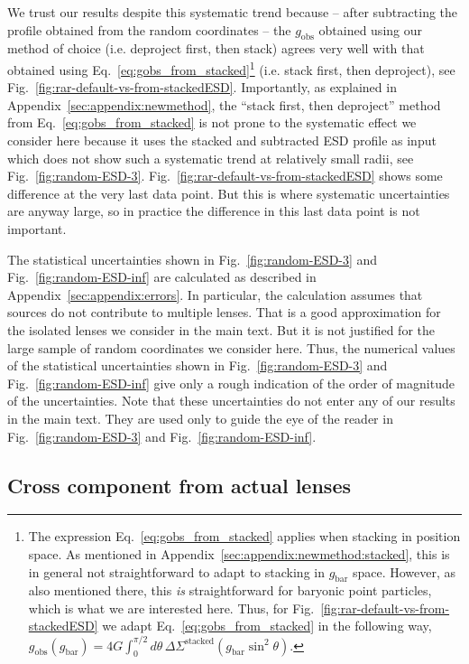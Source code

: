 \documentclass[a4paper,11pt]{article}
\newcommand{\gobs}{\ensuremath{g_{\mathrm{obs}}}}
\begin{document}
We trust our results despite this systematic trend because -- after subtracting the profile obtained from the random coordinates -- the $\gobs$ obtained using our method of choice (i.e. deproject first, then stack) agrees very well with that obtained using Eq.~\eqref{eq:gobs_from_stacked}\footnote{
  The expression Eq.~\eqref{eq:gobs_from_stacked} applies when stacking in position space.
  As mentioned in Appendix~\ref{sec:appendix:newmethod:stacked}, this is in general not straightforward to adapt to stacking in $g_{\mathrm{bar}}$ space.
  However, as also mentioned there, this \emph{is} straightforward for baryonic point particles, which is what we are interested here.
  Thus, for Fig.~\ref{fig:rar-default-vs-from-stackedESD} we adapt Eq.~\eqref{eq:gobs_from_stacked} in the following way, $g_{\mathrm{obs}}(g_{\mathrm{bar}}) = 4G \int_0^{\pi/2} d\theta \, \Delta \Sigma^{\mathrm{stacked}}(g_{\mathrm{bar}} \sin^2 \theta)$.
} (i.e. stack first, then deproject), see Fig.~\ref{fig:rar-default-vs-from-stackedESD}.
Importantly, as explained in Appendix~\ref{sec:appendix:newmethod}, the ``stack first, then deproject'' method from Eq.~\eqref{eq:gobs_from_stacked} is not prone to the systematic effect we consider here because it uses the stacked and subtracted ESD profile as input which does not show such a systematic trend at relatively small radii, see Fig.~\ref{fig:random-ESD-3}.
Fig.~\ref{fig:rar-default-vs-from-stackedESD} shows some difference at the very last data point.
But this is where systematic uncertainties are anyway large, so in practice the difference in this last data point is not important.

The statistical uncertainties shown in Fig.~\ref{fig:random-ESD-3} and Fig.~\ref{fig:random-ESD-inf} are calculated as described in Appendix~\ref{sec:appendix:errors}.
In particular, the calculation assumes that sources do not contribute to multiple lenses.
That is a good approximation for the isolated lenses we consider in the main text.
But it is not justified for the large sample of random coordinates we consider here.
Thus, the numerical values of the statistical uncertainties shown in Fig.~\ref{fig:random-ESD-3} and Fig.~\ref{fig:random-ESD-inf} give only a rough indication of the order of magnitude of the uncertainties.
Note that these uncertainties do not enter any of our results in the main text.
They are used only to guide the eye of the reader in Fig.~\ref{fig:random-ESD-3} and Fig.~\ref{fig:random-ESD-inf}.

\subsection{Cross component from actual lenses}
\label{sec:appendix:cross}
\end{document}

